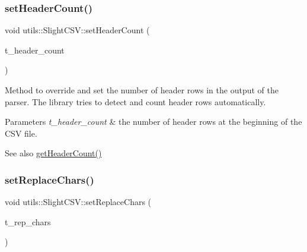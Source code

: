 \subsubsection{\texorpdfstring{set\+Header\+Count()}{setHeaderCount()}}
{\footnotesize\ttfamily void utils\+::\+Slight\+C\+S\+V\+::set\+Header\+Count (\begin{DoxyParamCaption}\item[{const size\+\_\+t}]{t\+\_\+header\+\_\+count }\end{DoxyParamCaption})}

Method to override and set the number of header rows in the output of the parser. The library tries to detect and count header rows automatically. 
\begin{DoxyParams}{Parameters}
{\em t\+\_\+header\+\_\+count} & the number of header rows at the beginning of the C\+SV file. \\
\hline
\end{DoxyParams}
\begin{DoxySeeAlso}{See also}
\hyperlink{classutils_1_1SlightCSV_a781ae99927f2b8d704add6a2a53e0051}{get\+Header\+Count()} 
\end{DoxySeeAlso}
\mbox{\label{classutils_1_1SlightCSV_a53c0ef807f8b40b124ffcda2df863b5f}} 
\subsubsection{\texorpdfstring{set\+Replace\+Chars()}{setReplaceChars()}}
{\footnotesize\ttfamily void utils\+::\+Slight\+C\+S\+V\+::set\+Replace\+Chars (\begin{DoxyParamCaption}\item[{const map$<$ string, string $>$ \&}]{t\+\_\+rep\+\_\+chars }\end{DoxyParamCaption})}

